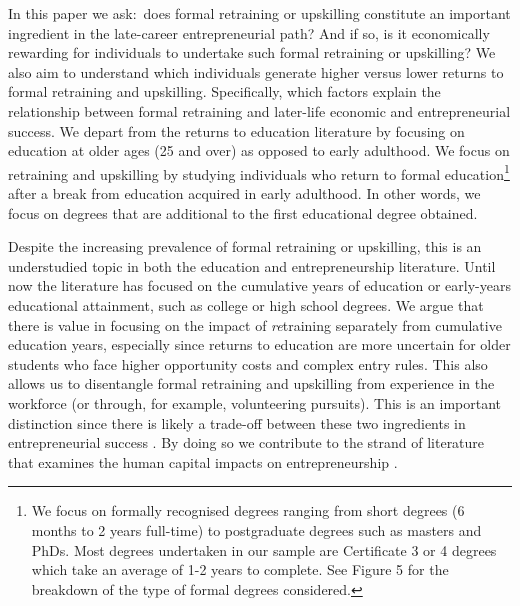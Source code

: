 \documentclass[12pt, a4paper]{article}
\begin{document}
In this paper we ask:~does formal retraining or upskilling constitute an important ingredient in the late-career entrepreneurial path? And if so, is it economically rewarding for individuals to undertake such formal retraining or upskilling? We also aim to understand which individuals generate higher versus lower returns to formal retraining and upskilling. Specifically, which factors explain the relationship between formal retraining and later-life economic and entrepreneurial success. We depart from the returns to education literature by focusing on education at older ages (25 and over) as opposed to early adulthood. We focus on retraining and upskilling by studying individuals who return to formal education\footnote{We focus on formally recognised degrees ranging from short degrees (6 months to 2 years full-time) to postgraduate degrees such as masters and PhDs. Most degrees undertaken in our sample are Certificate 3 or 4 degrees which take an average of 1-2 years to complete. See Figure 5 for the breakdown of the type of formal degrees considered.} after a break from education acquired in early adulthood. In other words, we focus on degrees that are additional to the first educational degree obtained. 

Despite the increasing prevalence of formal retraining or upskilling, this is an understudied topic in both the education and entrepreneurship literature. Until now the literature has focused on the cumulative years of education or early-years educational attainment, such as college or high school degrees. We argue that there is value in focusing on the impact of \textit{re}training separately from cumulative education years, especially since returns to education are more uncertain for older students who face higher opportunity costs and complex entry rules. This also allows us to disentangle formal retraining and upskilling from experience in the workforce (or through, for example, volunteering pursuits). This is an important distinction since there is likely a trade-off between these two ingredients in entrepreneurial success \citep{zacharakis2000}. By doing so we contribute to the strand of literature that examines the human capital impacts on entrepreneurship \citep{unger2011}. 
\end{document}
